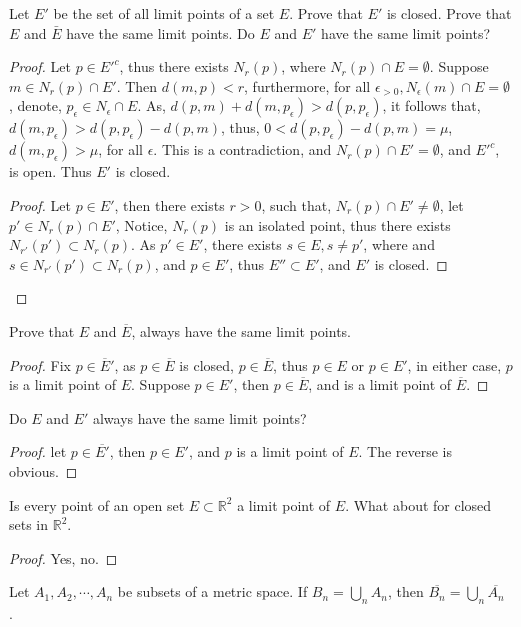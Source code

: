 \documentclass{amsart}
\numberwithin{equation}{section}
\theoremstyle{plain}
\theoremstyle{definition}
\begin{document}
\begin{enumerate}
  \item[(6)] Let $E'$ be the set of all limit points of a set $E$. Prove that $E'$ is closed. Prove that $E$ and $\bar{E}$ have the same limit points. Do
  $E$ and $E'$ have the same limit points?
  \begin{proof}
    Let $p \in E'^c$, thus there exists $N_r(p)$, where $N_r(p) \cap E = \emptyset$. Suppose $m \in N_r(p) \cap E'$.
    Then $d(m, p) < r$, furthermore, for all $\epsilon_{>0}, N_{\epsilon}(m) \cap E = \emptyset$, denote, $p_{\epsilon} \in N_{\epsilon} \cap E$.
    As, $d(p,m) + d(m,p_{\epsilon}) > d(p,p_{\epsilon})$, it follows that, $d(m,p_{\epsilon}) > d(p,p_{\epsilon}) - d(p, m)$, thus,
    $0 < d(p, p_{\epsilon}) - d(p,m) = \mu$, $d(m, p_{\epsilon}) > \mu$, for all $\epsilon$. This is a contradiction, and $N_r(p) \cap E' = \emptyset$, and $E'^c$, is open.
    Thus $E'$ is closed.
  \item[(6a.)]
  \begin{proof}
    Let $p \in E'$, then there exists $r >0$, such that, $N_r(p) \cap E' \not = \emptyset$, let $p' \in N_r(p) \cap E'$, 
    Notice, $N_r(p)$ is an isolated point, thus there exists $N_{r'}(p') \subset N_r(p)$. As $p' \in E'$, there exists $s \in E, s \not= p'$, where
    and $s \in N_{r'}(p') \subset N_r(p)$, and $p \in E'$, thus $E'' \subset E'$, and $E'$ is closed.
  \end{proof}
  \end{proof}
  \item[(7)] Prove that $E$ and $\overline{E}$, always have the same limit points.
  \begin{proof}
    Fix $p \in \overline{E}'$, as $p \in \overline{E}$ is closed, $p \in \overline{E}$, thus $p \in E$ or $p \in E'$, in either case, $p$ is a limit point of $E$.
    Suppose $p \in E'$, then $p \in \overline{E}$, and is a limit point of $\overline{E}$.
  \end{proof}
  \item[(8)] Do $E$ and $E'$ always have the same limit points?
  \begin{proof}
    let $p \in \overline{E'}$, then $p \in E'$, and $p$ is a limit point of $E$. The reverse is obvious.
  \end{proof}
  \item[(9)] Is every point of an open set $E \subset \mathbb{R}^2$ a limit point of $E$. What about for closed sets in $\mathbb{R}^2$.
  \begin{proof}
    Yes, no.
  \end{proof}
  \item[(10)] Let $A_1, A_2, \cdots, A_n$ be subsets of a metric space. If $B_n = \bigcup_n A_n$, then $\overline{B_n} = \bigcup_n \overline{A_n}$ .

\end{enumerate}
\end{document}
